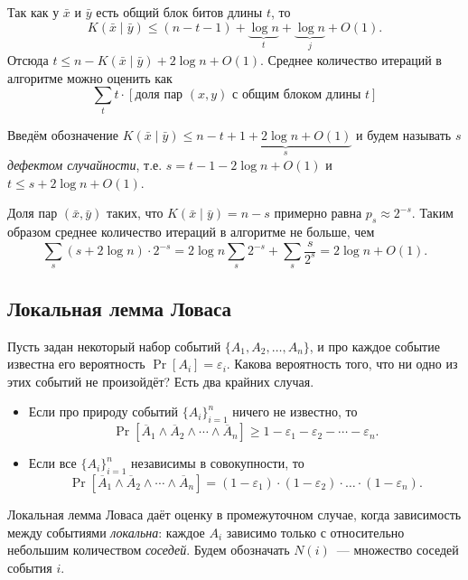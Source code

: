 \documentclass[12pt]{article}
\newcommand{\seqn}[2]{{#1}_1,{#1}_2,\dotsc,{#1}_{#2}}
\theoremstyle{definition}
\theoremstyle{plain}
\theoremstyle{remark}
\begin{document}
Так как у $\bar x$ и $\bar y$ есть общий блок битов длины $t$, то
\[
    K(\bar x\mid\bar y)\le (n-t-1) + \underbrace{\log n}_{t} + \underbrace{\log n}_{j} + O(1).
\]
Отсюда $t\le n - K(\bar x\mid\bar y) + 2\log n + O(1).$ Среднее количество
итераций в алгоритме можно оценить как
\[
    \sum_t t\cdot [\text{доля пар $(x,y)$ с общим блоком длины $t$}]
\]

Введём обозначение
$K(\bar x\mid \bar y)\le n - \underbrace{t + 1 + 2\log n + O(1)}_{s}$ и будем
называть $s$ \emph{дефектом случайности}, т.е. $s = t - 1 - 2\log n + O(1)$ и
$t\le s + 2\log n + O(1)$.

Доля пар $(\bar x, \bar y)$ таких, что $K(\bar x\mid \bar y) = n - s$
примерно равна $p_s\approx 2^{-s}$. Таким образом среднее количество итераций в
алгоритме не больше, чем
\[
    \sum_s (s + 2\log n)\cdot 2^{-s} = 2\log n\sum_s 2^{-s} + \sum_s \frac{s}{2^s}
    = 2\log n + O(1).
\]


\subsection{Локальная лемма Ловаса}
Пусть задан некоторый набор событий $\{\seqn{A}{n}\}$, и про каждое событие
известна его вероятность $\Pr[A_i] = \varepsilon_i$. 
Какова вероятность 
того, что ни одно из этих событий не произойдёт? Есть два крайних случая. 
\begin{itemize}
    \item Если про природу событий $\{A_i\}_{i=1}^n$ ничего не известно, то
    \[
    \Pr[\overline{A}_1\land\overline{A}_2\land\dotsb\land\overline{A}_n] 
        \ge 1 - \varepsilon_1 - \varepsilon_2 -\dotsb -\varepsilon_n. 
    \]

    \item Если все $\{A_i\}_{i=1}^n$ независимы в совокупности, то
    \[
    \Pr[\overline{A}_1\land\overline{A}_2\land\dotsb\land\overline{A}_n] 
        = (1 - \varepsilon_1)\cdot(1 - \varepsilon_2) \cdot\dotso\cdot (1 - \varepsilon_n). 
    \]
\end{itemize}

Локальная лемма Ловаса даёт оценку в промежуточном случае, когда зависимость
между событиями \emph{локальна}: каждое $A_i$ зависимо только с относительно небольшим
количеством \emph{соседей}. Будем обозначать $N(i)$~--- множество соседей события $i$.
\end{document}
